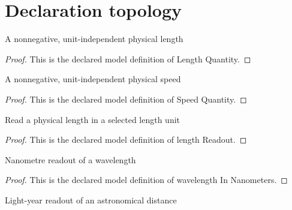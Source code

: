 \section{Declaration topology}
\begin{definition}
  \label{def:physics:phyx-mini-0596:phyxminiproblems-problemphyxmini0596-lengthquantity}
  A nonnegative, unit-independent physical length
\end{definition}
\begin{proof}
  This is the declared model definition of Length Quantity.
\end{proof}
\begin{definition}
  \label{def:physics:phyx-mini-0596:phyxminiproblems-problemphyxmini0596-speedquantity}
  A nonnegative, unit-independent physical speed
\end{definition}
\begin{proof}
  This is the declared model definition of Speed Quantity.
\end{proof}
\begin{definition}
  \label{def:physics:phyx-mini-0596:phyxminiproblems-problemphyxmini0596-lengthreadout}
  Read a physical length in a selected length unit
\end{definition}
\begin{proof}
  This is the declared model definition of length Readout.
\end{proof}
\begin{definition}
  \label{def:physics:phyx-mini-0596:phyxminiproblems-problemphyxmini0596-wavelengthinnanometers}
  Nanometre readout of a wavelength
\end{definition}
\begin{proof}
  This is the declared model definition of wavelength In Nanometers.
\end{proof}
\begin{definition}
  \label{def:physics:phyx-mini-0596:phyxminiproblems-problemphyxmini0596-distanceinlightyears}
  Light-year readout of an astronomical distance
\end{definition}
